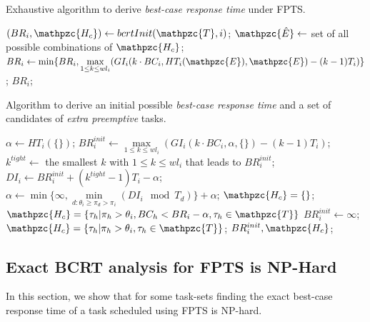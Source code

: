 \documentclass[fleqn]{article}
\begin{document}
\begin{algorithm}[H]
	\caption{Exhaustive algorithm to derive \textit{best-case response time} under FPTS.}\label{euclid}
	\begin{algorithmic}[1]
		\State $(BR_i, \mathpzc{H_c}) \gets bcrtInit( \mathpzc{T},i)$;
		\State $\mathpzc{\hat{E}} \gets$ set of all possible combinations of  $\mathpzc{H_c}$;
		\State $BR_i \gets \min\{BR_i, \max \limits_{1 \leq k \leq wl_i} (GI_i(k \cdot BC_i, HT_i(\mathpzc{E}), \mathpzc{E}) - (k-1)T_i)\}$;
		\State \Return $BR_i$; 
		\EndProcedure
	\end{algorithmic}
\end{algorithm}

\begin{algorithm}[H]
	\caption{Algorithm to derive an initial possible \textit{best-case response time} and a set of candidates of \textit{extra preemptive} tasks.}\label{euclid}
	\begin{algorithmic}[1]
		\State $\alpha \gets HT_i(\{\})$;
		\State $BR^{init}_i \gets \max \limits_{1 \leq k \leq wl_i} (GI_i(k \cdot BC_i, \alpha, \{\}) - (k-1)T_i)$;
		\State $k^{tight} \gets$ the smallest $k$ with $1 \leq k \leq wl_i$ that leads to $BR^{init}_i$;
		\State $DI_i \gets BR^{init}_i + (k^{tight}-1)T_i - \alpha$;
		\State $\alpha \gets \min \{\infty , \min \limits_{d:\theta_i \geq \pi_d > \pi_i} (DI_i \mod T_d)\} + \alpha$;
		\State $\mathpzc{H_c} = \{\}$;
		\Else
		\State $\mathpzc{H_c} = \{\tau_h | \pi_h > \theta_i, BC_h < BR_i - \alpha, \tau_h \in \mathpzc{T}\}$
		\Else
		\State $BR^{init}_i \gets\infty$; 
		\State $\mathpzc{H_c} = \{\tau_h | \pi_h > \theta_i, \tau_h \in \mathpzc{T}\}$;
		\State \Return $BR^{init}_i, \mathpzc{H_c}$; 
		\EndProcedure
	\end{algorithmic}
\end{algorithm}

\subsection{Exact BCRT analysis for FPTS is NP-Hard}

In this section, we show that for some task-sets finding the exact best-case response time of a task scheduled using FPTS is NP-hard.
\end{document}
